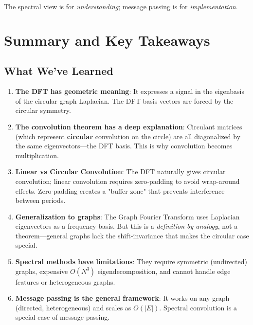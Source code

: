 \begin{notechapter}
\begin{remark}
The spectral view is for \emph{understanding}; message passing is for 
\emph{implementation}.
\end{remark}

\section{Summary and Key Takeaways}

\subsection{What We've Learned}

\begin{enumerate}
\item \textbf{The DFT has geometric meaning}: It expresses a signal in 
      the eigenbasis of the circular graph Laplacian. The DFT basis 
      vectors are forced by the circular symmetry.

\item \textbf{The convolution theorem has a deep explanation}: 
      Circulant matrices (which represent \textbf{circular} convolution 
      on the circle) are all diagonalized by the same eigenvectors---the 
      DFT basis. This is why convolution becomes multiplication.

\item \textbf{Linear vs Circular Convolution}: The DFT naturally gives 
      circular convolution; linear convolution requires zero-padding to 
      avoid wrap-around effects. Zero-padding creates a "buffer zone" 
      that prevents interference between periods.

\item \textbf{Generalization to graphs}: The Graph Fourier Transform 
      uses Laplacian eigenvectors as a frequency basis. But this is a 
      \emph{definition by analogy}, not a theorem---general graphs lack 
      the shift-invariance that makes the circular case special.

\item \textbf{Spectral methods have limitations}: They require symmetric 
      (undirected) graphs, expensive $O(N^3)$ eigendecomposition, and 
      cannot handle edge features or heterogeneous graphs.

\item \textbf{Message passing is the general framework}: It works on 
      any graph (directed, heterogeneous) and scales as $O(|E|)$. 
      Spectral convolution is a special case of message passing.


\end{enumerate}
\end{notechapter}
